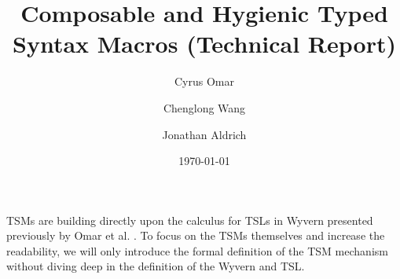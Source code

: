 \documentclass[12pt]{article}
\title{Composable and Hygienic Typed Syntax Macros (Technical Report)}
\author{Cyrus Omar \and Chenglong Wang \and Jonathan Aldrich}
\date{\today}
\begin{document}
\renewcommand*{\thepage}{title-\arabic{page}} 
\maketitle
\renewcommand*{\thepage}{\arabic{page}} 
\appendix

TSMs are building directly upon the calculus for TSLs in Wyvern presented previously by Omar et al. \cite{TSLs}. To focus on the TSMs themselves and increase the readability, we will only introduce the formal definition of the TSM mechanism without diving deep in the definition of the Wyvern and TSL.




\FloatBarrier


\end{document}
